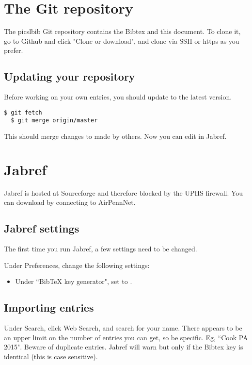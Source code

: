 \documentclass{InsightArticle}
\begin{document}
\section{The Git repository}

The picslbib Git repository contains the Bibtex and this document. To clone it, go to Github and click "Clone or download", and clone via SSH or https as you prefer.


\subsection{Updating your repository}

Before working on your own entries, you should update to the latest version.
\begin{lstlisting}[style=bash]
  $ git fetch
  $ git merge origin/master
\end{lstlisting}

This should merge changes to  made by others. Now you can edit  in Jabref.

\section{Jabref}

Jabref is hosted at Sourceforge and therefore blocked by the UPHS firewall. You can download by connecting to AirPennNet.


\subsection{Jabref settings}

The first time you run Jabref, a few settings need to be changed.

Under Preferences, change the following settings:
\begin{itemize}
\item Under ``BibTeX key generator", set  to .
\end{itemize}


\subsection{Importing entries}

Under Search, click Web Search, and search for your name. There appears to be an upper limit on the number of entries you can get, so be specific. Eg, ``Cook PA 2015". Beware of duplicate entries. Jabref will warn but only if the Bibtex key is identical (this is case sensitive).
\end{document}
